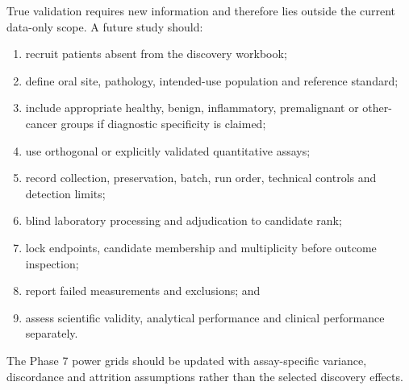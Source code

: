 True validation requires new information and therefore lies outside the current data-only scope. A future study should:

\begin{enumerate}
\item recruit patients absent from the discovery workbook;
\item define oral site, pathology, intended-use population and reference standard;
\item include appropriate healthy, benign, inflammatory, premalignant or other-cancer groups if diagnostic specificity is claimed;
\item use orthogonal or explicitly validated quantitative assays;
\item record collection, preservation, batch, run order, technical controls and detection limits;
\item blind laboratory processing and adjudication to candidate rank;
\item lock endpoints, candidate membership and multiplicity before outcome inspection;
\item report failed measurements and exclusions; and
\item assess scientific validity, analytical performance and clinical performance separately.
\end{enumerate}

The Phase 7 power grids should be updated with assay-specific variance, discordance and attrition assumptions rather than the selected discovery effects.
